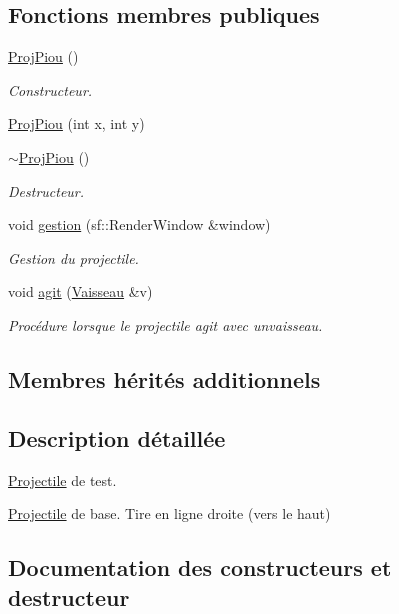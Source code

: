 \subsection*{Fonctions membres publiques}
\begin{DoxyCompactItemize}
\item 
\hyperlink{class_proj_piou_a73d8a01dc3e09f926d14b95b673fd41d}{Proj\+Piou} ()
\begin{DoxyCompactList}\small\item\em Constructeur. \end{DoxyCompactList}\item 
\hyperlink{class_proj_piou_a4aa12294ad8b563aa00848e395fdf06b}{Proj\+Piou} (int x, int y)
\item 
\hyperlink{class_proj_piou_a02224f153ad53afc2b1c40b986ec6492}{$\sim$\+Proj\+Piou} ()
\begin{DoxyCompactList}\small\item\em Destructeur. \end{DoxyCompactList}\item 
void \hyperlink{class_proj_piou_a01b45e4045391883472e283e027cf7de}{gestion} (sf\+::\+Render\+Window \&window)
\begin{DoxyCompactList}\small\item\em Gestion du projectile. \end{DoxyCompactList}\item 
void \hyperlink{class_proj_piou_a1594d1ba2fd53ff82af597d2505a7db2}{agit} (\hyperlink{class_vaisseau}{Vaisseau} \&v)
\begin{DoxyCompactList}\small\item\em Procédure lorsque le projectile agit avec unvaisseau. \end{DoxyCompactList}\end{DoxyCompactItemize}
\subsection*{Membres hérités additionnels}


\subsection{Description détaillée}
\hyperlink{class_projectile}{Projectile} de test. 

\hyperlink{class_projectile}{Projectile} de base. Tire en ligne droite (vers le haut) 

\subsection{Documentation des constructeurs et destructeur}
\mbox{\label{class_proj_piou_a73d8a01dc3e09f926d14b95b673fd41d}} 
